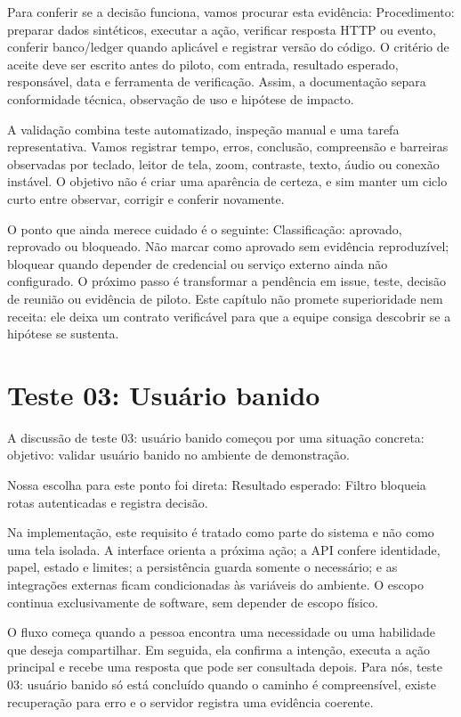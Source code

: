 \documentclass[12pt,oneside,a4paper,article]{abntex2}
\begin{document}
Para conferir se a decisão funciona, vamos procurar esta evidência: Procedimento: preparar dados sintéticos, executar a ação, verificar resposta HTTP ou evento, conferir banco/ledger quando aplicável e registrar versão do código. O critério de aceite deve ser escrito antes do piloto, com entrada, resultado esperado, responsável, data e ferramenta de verificação. Assim, a documentação separa conformidade técnica, observação de uso e hipótese de impacto.

A validação combina teste automatizado, inspeção manual e uma tarefa representativa. Vamos registrar tempo, erros, conclusão, compreensão e barreiras observadas por teclado, leitor de tela, zoom, contraste, texto, áudio ou conexão instável. O objetivo não é criar uma aparência de certeza, e sim manter um ciclo curto entre observar, corrigir e conferir novamente.

O ponto que ainda merece cuidado é o seguinte: Classificação: aprovado, reprovado ou bloqueado. Não marcar como aprovado sem evidência reproduzível; bloquear quando depender de credencial ou serviço externo ainda não configurado. O próximo passo é transformar a pendência em issue, teste, decisão de reunião ou evidência de piloto. Este capítulo não promete superioridade nem receita: ele deixa um contrato verificável para que a equipe consiga descobrir se a hipótese se sustenta.

\section{Teste 03: Usuário banido}
A discussão de teste 03: usuário banido começou por uma situação concreta: objetivo: validar usuário banido no ambiente de demonstração.

Nossa escolha para este ponto foi direta: Resultado esperado: Filtro bloqueia rotas autenticadas e registra decisão.

Na implementação, este requisito é tratado como parte do sistema e não como uma tela isolada. A interface orienta a próxima ação; a API confere identidade, papel, estado e limites; a persistência guarda somente o necessário; e as integrações externas ficam condicionadas às variáveis do ambiente. O escopo continua exclusivamente de software, sem depender de escopo físico.

O fluxo começa quando a pessoa encontra uma necessidade ou uma habilidade que deseja compartilhar. Em seguida, ela confirma a intenção, executa a ação principal e recebe uma resposta que pode ser consultada depois. Para nós, teste 03: usuário banido só está concluído quando o caminho é compreensível, existe recuperação para erro e o servidor registra uma evidência coerente.
\end{document}
